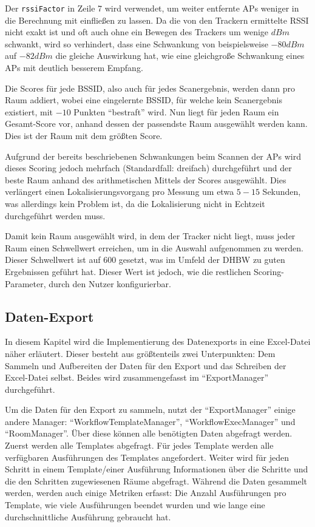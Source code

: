 Der \texttt{rssiFactor} in Zeile 7 wird verwendet, um weiter entfernte \glspl{AP} weniger in die
Berechnung mit einfließen zu lassen. Da die von den Trackern ermittelte \gls{RSSI} nicht exakt ist
und oft auch ohne ein Bewegen des Trackers um wenige $dBm$ schwankt, wird so verhindert, dass eine
Schwankung von beispielsweise $-80dBm$ auf $-82dBm$ die gleiche Auswirkung hat, wie eine gleichgroße
Schwankung eines \gls{AP}s mit deutlich besserem Empfang.

Die Scores für jede \gls{BSSID}, also auch für jedes Scanergebnis, werden dann pro Raum addiert,
wobei eine eingelernte \gls{BSSID}, für welche kein Scanergebnis existiert, mit $-10$ Punkten
\enquote{bestraft} wird. Nun liegt für jeden Raum ein Gesamt-Score vor, anhand dessen der passendste
Raum ausgewählt werden kann. Dies ist der Raum mit dem größten Score.

Aufgrund der bereits beschriebenen Schwankungen beim Scannen der \glspl{AP} wird dieses Scoring
jedoch mehrfach (Standardfall: dreifach) durchgeführt und der beste Raum anhand des arithmetischen
Mittels der Scores ausgewählt. Dies verlängert einen Lokalisierungsvorgang pro Messung um etwa
$5-15$ Sekunden, was allerdings kein Problem ist, da die Lokalisierung nicht in Echtzeit
durchgeführt werden muss.

Damit kein Raum ausgewählt wird, in dem der Tracker nicht liegt, muss jeder Raum einen Schwellwert
erreichen, um in die Auswahl aufgenommen zu werden. Dieser Schwellwert ist auf $600$ gesetzt, was im
Umfeld der \gls{DHBW} zu guten Ergebnissen geführt hat. Dieser Wert ist jedoch, wie die restlichen
Scoring-Parameter, durch den Nutzer konfigurierbar.

\subsection{Daten-Export}

In diesem Kapitel wird die Implementierung des Datenexports in eine Excel-Datei näher erläutert.
Dieser besteht aus größtenteils zwei Unterpunkten: Dem Sammeln und Aufbereiten der Daten für den
Export und das Schreiben der Excel-Datei selbst.
Beides wird zusammengefasst im \enquote{ExportManager} durchgeführt.

Um die Daten für den Export zu sammeln, nutzt der \enquote{ExportManager} einige andere Manager:
\enquote{WorkflowTemplateManager}, \enquote{WorkflowExecManager} und \enquote{RoomManager}.
Über diese können alle benötigten Daten abgefragt werden.
Zuerst werden alle Templates abgefragt.
Für jedes Template werden alle verfügbaren Ausführungen des Templates angefordert.
Weiter wird für jeden Schritt in einem Template/einer Ausführung Informationen über die Schritte und die den Schritten
zugewiesenen Räume abgefragt.
Während die Daten gesammelt werden, werden auch einige Metriken erfasst: Die Anzahl Ausführungen pro Template,
wie viele Ausführungen beendet wurden und wie lange eine durchschnittliche Ausführung gebraucht hat.

